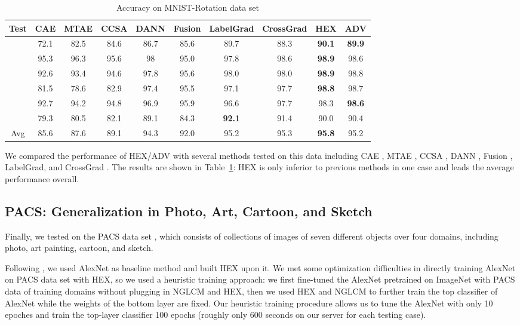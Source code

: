 \begin{table}[]
\centering
\begin{tabular}{cccccccccc}
\hline
Test & CAE & MTAE & CCSA & DANN & Fusion & LabelGrad & CrossGrad & HEX & ADV\\ \hline
 & 72.1 & 82.5 & 84.6 & 86.7& 85.6 & 89.7 & 88.3 & \textbf{90.1} & \textbf{89.9} \\
 & 95.3 & 96.3 & 95.6 & 98& 95.0 & 97.8 & 98.6 & \textbf{98.9} & 98.6 \\
 & 92.6 & 93.4 & 94.6 & 97.8& 95.6 & 98.0 & 98.0 & \textbf{98.9} & 98.8 \\
 & 81.5 & 78.6 & 82.9 & 97.4&95.5 & 97.1 & 97.7 & \textbf{98.8} & 98.7\\
 & 92.7 & 94.2 & 94.8 & 96.9&95.9 & 96.6 & 97.7 & 98.3 & \textbf{98.6} \\
 & 79.3 & 80.5 & 82.1 & 89.1& 84.3 & \textbf{92.1} & 91.4 & 90.0 & 90.4\\
\hline
Avg & 85.6 & 87.6 & 89.1 & 94.3 & 92.0 & 95.2 & 95.3 & \textbf{95.8} & 95.2 \\
\hline
\end{tabular}
\caption{Accuracy on MNIST-Rotation data set}
\label{tab:rotated}
\end{table}

We compared the performance of HEX/ADV with several methods tested on this data including CAE \citep{rifai2011contractive}, MTAE \citep{ghifary2015domain}, CCSA \citep{motiian2017unified}, DANN \citep{ganin2016domain}, Fusion \citep{mancini2018best}, LabelGrad, and CrossGrad \citep{shankar2018generalizing}. 
The results are shown in Table~\ref{tab:rotated}: 
HEX is only inferior to previous methods in one case 
and leads the average performance overall. 

\subsection{PACS: Generalization in Photo, Art, Cartoon, and Sketch}
Finally, we tested on the PACS data set \citep{li2017deeper}, which consists of collections of images of seven different objects over four domains, including photo, art painting, cartoon, and sketch. 

Following \citep{li2017deeper}, we used AlexNet as baseline method 
and built HEX upon it. 
We met some optimization difficulties in directly training AlexNet 
on PACS data set with HEX, 
so we used a heuristic training approach: 
we first fine-tuned the AlexNet pretrained on ImageNet 
with PACS data of training domains without plugging in NGLCM and HEX,
then we used HEX and NGLCM to further train the top classifier of AlexNet 
while the weights of the bottom layer are fixed. 
Our heuristic training procedure allows us to tune the AlexNet with only 10 epoches and train the top-layer classifier 100 epochs (roughly only 600 seconds on our server for each testing case). 

